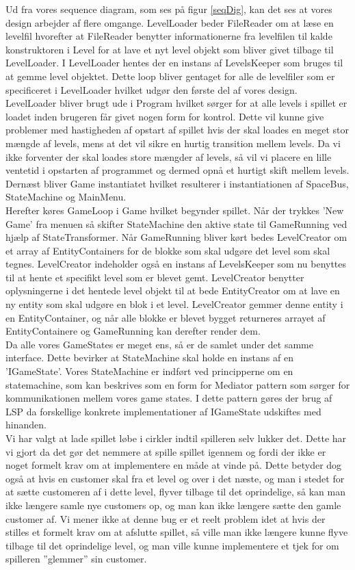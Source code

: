 Ud fra vores sequence diagram, som ses på figur \ref{seqDig}, kan det ses at vores design arbejder af flere omgange. LevelLoader beder FileReader om at læse en levelfil hvorefter at FileReader benytter informationerne fra levelfilen til kalde konstruktoren i Level for at lave et nyt level objekt som bliver givet tilbage til LevelLoader. I LevelLoader hentes der en instans af LevelsKeeper som bruges til at gemme level objektet. Dette loop bliver gentaget for alle de levelfiler som er specificeret i LevelLoader hvilket udgør den første del af vores design. LevelLoader bliver brugt ude i Program hvilket sørger for at alle levels i spillet er loadet inden brugeren får givet nogen form for kontrol. Dette vil kunne give problemer med hastigheden af opstart af spillet hvis der skal loades en meget stor mængde af levels, mens at det vil sikre en hurtig transition mellem levels. Da vi ikke forventer der skal loades store mængder af levels, så vil vi placere en lille ventetid i opstarten af programmet og dermed opnå et hurtigt skift mellem levels. \\
Dernæst bliver Game instantiatet hvilket resulterer i instantiationen af SpaceBus, StateMachine og MainMenu.\\
Herefter køres GameLoop i Game hvilket begynder spillet. Når der trykkes 'New Game' fra menuen så skifter StateMachine den aktive state til GameRunning ved hjælp af StateTransformer. Når GameRunning bliver kørt bedes LevelCreator om et array af EntityContainers for de blokke som skal udgøre det level som skal tegnes. LevelCreator indeholder også en instans af LevelsKeeper som nu benyttes til at hente et specifikt level som er blevet gemt. LevelCreator benytter oplysningerne i det hentede level objekt til at bede EntityCreator om at lave en ny entity som skal udgøre en blok i et level. LevelCreator gemmer denne entity i en EntityContainer, og når alle blokke er blevet bygget returneres arrayet af EntityContainere og GameRunning kan derefter render dem.\\
Da alle vores GameStates er meget ens, så er de samlet under det samme interface. Dette bevirker at StateMachine skal holde en instans af en 'IGameState'. Vores StateMachine er indført ved principperne om en statemachine, som kan beskrives som en form for Mediator pattern som sørger for kommunikationen mellem vores game states. I dette pattern gøres der brug af LSP da forskellige konkrete implementationer af IGameState udskiftes med hinanden.\\

Vi har valgt at lade spillet løbe i cirkler indtil spilleren selv lukker det. Dette har vi gjort da det gør det nemmere at spille spillet igennem og fordi der ikke er noget formelt krav om at implementere en måde at vinde på. Dette betyder dog også at hvis en customer skal fra et level og over i det næste, og man i stedet for at sætte customeren af i dette level, flyver tilbage til det oprindelige, så kan man ikke længere samle nye customers op, og man kan ikke længere sætte den gamle customer af. Vi mener ikke at denne bug er et reelt problem idet at hvis der stilles et formelt krav om at afslutte spillet, så ville man ikke længere kunne flyve tilbage til det oprindelige level, og man ville kunne implementere et tjek for om spilleren ''glemmer'' sin customer.

